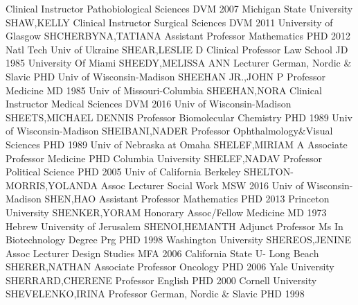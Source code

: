 \documentclass[
]{article}
\begin{document}
\textbar{}  \textbar Clinical Instructor
\textbar Pathobiological Sciences \textbar DVM 2007 Michigan State
University \textbar SHAW,KELLY \textbar{}  \textbar Clinical
Instructor \textbar Surgical Sciences \textbar DVM 2011 University of
Glasgow \textbar SHCHERBYNA,TATIANA \textbar{} 
\textbar Assistant Professor \textbar Mathematics \textbar PHD 2012 Natl
Tech Univ of Ukraine \textbar SHEAR,LESLIE D \textbar{} 
\textbar Clinical Professor \textbar Law School \textbar JD 1985
University Of Miami \textbar SHEEDY,MELISSA ANN \textbar{} 
\textbar Lecturer \textbar German, Nordic \& Slavic \textbar PHD Univ of
Wisconsin-Madison \textbar SHEEHAN JR.,JOHN P \textbar{} 
\textbar Professor \textbar Medicine \textbar MD 1985 Univ of
Missouri-Columbia \textbar SHEEHAN,NORA \textbar{} 
\textbar Clinical Instructor \textbar Medical Sciences \textbar DVM 2016
Univ of Wisconsin-Madison \textbar SHEETS,MICHAEL DENNIS \textbar{}
 \textbar Professor \textbar Biomolecular Chemistry
\textbar PHD 1989 Univ of Wisconsin-Madison \textbar SHEIBANI,NADER
\textbar{}  \textbar Professor
\textbar Ophthalmology\&Visual Sciences \textbar PHD 1989 Univ of
Nebraska at Omaha \textbar SHELEF,MIRIAM A \textbar{} 
\textbar Associate Professor \textbar Medicine \textbar PHD Columbia
University \textbar SHELEF,NADAV \textbar{} 
\textbar Professor \textbar Political Science \textbar PHD 2005 Univ of
California Berkeley \textbar SHELTON-MORRIS,YOLANDA \textbar{}
 \textbar Assoc Lecturer \textbar Social Work \textbar MSW
2016 Univ of Wisconsin-Madison \textbar SHEN,HAO \textbar{} 
\textbar Assistant Professor \textbar Mathematics \textbar PHD 2013
Princeton University \textbar SHENKER,YORAM \textbar{} 
\textbar Honorary Assoc/Fellow \textbar Medicine \textbar MD 1973 Hebrew
University of Jerusalem \textbar SHENOI,HEMANTH \textbar{} 
\textbar Adjunct Professor \textbar Ms In Biotechnology Degree Prg
\textbar PHD 1998 Washington University \textbar SHEREOS,JENINE
\textbar{}  \textbar Assoc Lecturer \textbar Design Studies
\textbar MFA 2006 California State U- Long Beach \textbar SHERER,NATHAN
\textbar{}  \textbar Associate Professor \textbar Oncology
\textbar PHD 2006 Yale University \textbar SHERRARD,CHERENE \textbar{}
 \textbar Professor \textbar English \textbar PHD 2000
Cornell University \textbar SHEVELENKO,IRINA \textbar{} 
\textbar Professor \textbar German, Nordic \& Slavic \textbar PHD 1998
\end{document}
